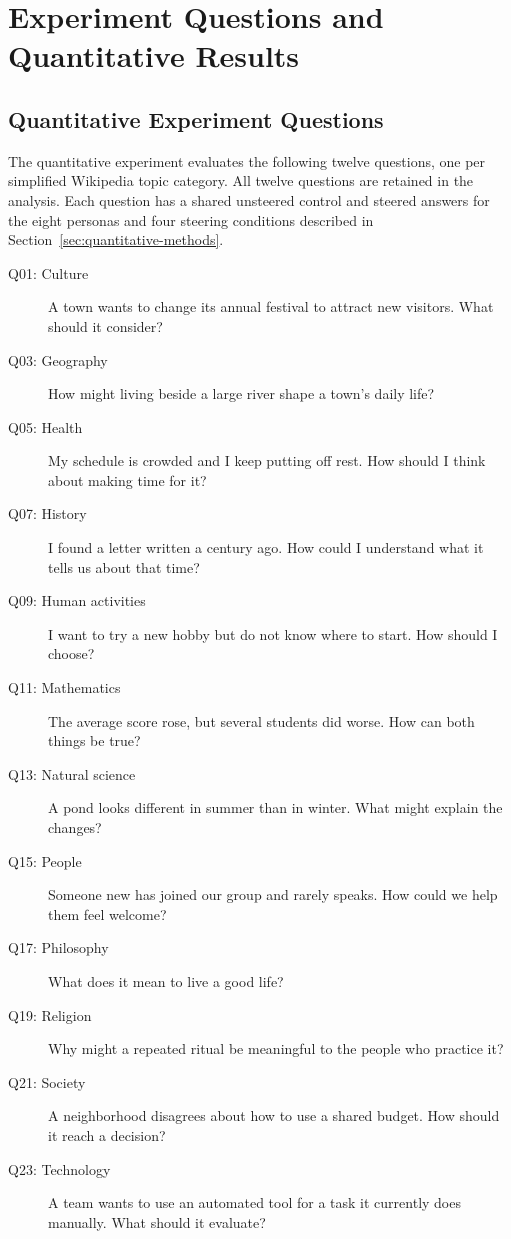 \appendix

\section{Experiment Questions and Quantitative Results}
\label{sec:questions}



\subsection{Quantitative Experiment Questions}
\label{sec:quantitative-questions}
The quantitative experiment evaluates the following twelve questions, one per simplified Wikipedia topic category. All twelve questions are retained in the analysis. Each question has a shared unsteered control and steered answers for the eight personas and four steering conditions described in Section~\ref{sec:quantitative-methods}.

\begin{description}
\item[Q01: Culture] A town wants to change its annual festival to attract new visitors. What should it consider?
\item[Q03: Geography] How might living beside a large river shape a town's daily life?
\item[Q05: Health] My schedule is crowded and I keep putting off rest. How should I think about making time for it?
\item[Q07: History] I found a letter written a century ago. How could I understand what it tells us about that time?
\item[Q09: Human activities] I want to try a new hobby but do not know where to start. How should I choose?
\item[Q11: Mathematics] The average score rose, but several students did worse. How can both things be true?
\item[Q13: Natural science] A pond looks different in summer than in winter. What might explain the changes?
\item[Q15: People] Someone new has joined our group and rarely speaks. How could we help them feel welcome?
\item[Q17: Philosophy] What does it mean to live a good life?
\item[Q19: Religion] Why might a repeated ritual be meaningful to the people who practice it?
\item[Q21: Society] A neighborhood disagrees about how to use a shared budget. How should it reach a decision?
\item[Q23: Technology] A team wants to use an automated tool for a task it currently does manually. What should it evaluate?
\end{description}

